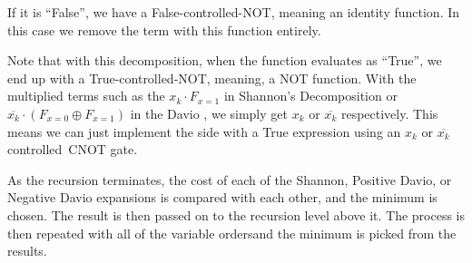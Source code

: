 \documentclass[paper]{ieice}
\providecommand{\DIFadd}[1]{{\protect\color{blue}{#1}}} %
\providecommand{\DIFaddbegin}{} %
\providecommand{\DIFaddend}{} %
\newcommand{\DIFaddincludegraphics}[2][]{{\color{blue}\fbox{\DIFOincludegraphics[#1]{#2}}}} %
\DeclareRobustCommand{\DIFaddbegin}{\DIFOaddbegin \let\includegraphics\DIFaddincludegraphics} %
\DeclareRobustCommand{\DIFaddend}{\DIFOaddend \let\includegraphics\DIFOincludegraphics} %
\begin{document}
If it is ``False'', we have a False-controlled-NOT, meaning an identity function. In this case we remove the term
with this function entirely.

Note that with this decomposition, when the function evaluates as ``True'', we end up with a True-controlled-NOT, meaning, a NOT function. With the multiplied terms such as the $x_k \cdot F_{x=1}$ in Shannon's Decomposition or $\overline{x_k} \cdot (F_{x=0} \oplus F_{x=1})$ in the Davio  \DIFaddbegin \DIFadd{expansion }\DIFaddend , we simply get $x_k$ or $\overline{x_k}$ respectively. This means we can just implement the side with a True expression using an $x_k$ or $\overline{x_k}$ controlled~CNOT gate. 

As the recursion terminates, the cost of each of the Shannon, Positive Davio, or Negative Davio expansions is
compared with each other, and the minimum is chosen. The result is then passed on to the recursion level above it.
The process is then repeated with all of the variable orders\DIFaddbegin \DIFadd{, }\DIFaddend and the minimum is picked from the results. 
\end{document}
